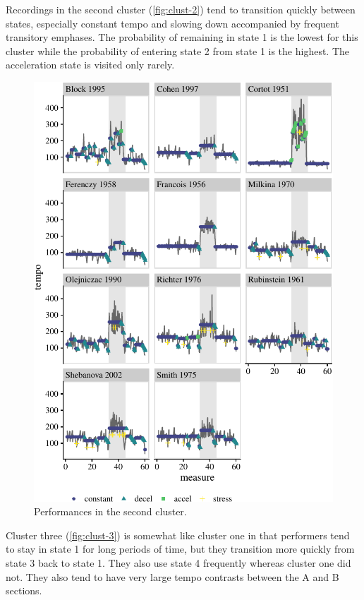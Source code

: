 \documentclass[aoas]{imsart}
\begin{document}
Recordings in the second cluster (\autoref{fig:clust-2}) tend to
transition quickly between states, especially constant tempo and slowing
down accompanied by frequent transitory emphases. The probability of
remaining in state 1 is the lowest for this cluster while the
probability of entering state 2 from state 1 is the highest. The
acceleration state is visited only rarely.

\begin{figure}

{\centering \includegraphics{gfx/clust-2-1} 

}

\caption{Performances in the second cluster.}\label{fig:clust-2}
\end{figure}

Cluster three (\autoref{fig:clust-3}) is somewhat like cluster one in
that performers tend to stay in state 1 for long periods of time, but
they transition more quickly from state 3 back to state 1. They also use
state 4 frequently whereas cluster one did not. They also tend to have
very large tempo contrasts between the A and B sections.
\end{document}
